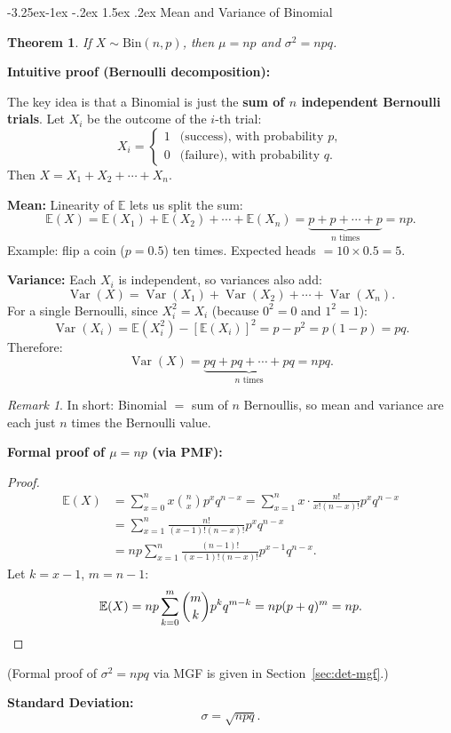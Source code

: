 \documentclass{article}
\makeatletter
\newtheorem{theorem}{Theorem}[section]
\theoremstyle{remark}
\newtheorem*{remark}{Remark}
\newlength{\subsecindent}
\renewcommand\subsection{\@startsection{subsection}{2}{\subsecindent}%
  {-3.25ex\@plus -1ex \@minus -.2ex}%
  {1.5ex \@plus .2ex}%
  {\normalfont\large\bfseries}}
\newenvironment{sub}{%
  \begin{list}{}{%
    \setlength{\leftmargin}{4em}%
    \setlength{\rightmargin}{0pt}%
    \setlength{\topsep}{0pt}%
    \setlength{\partopsep}{0pt}%
    \setlength{\parsep}{\parskip}%
    \setlength{\itemsep}{\parskip}%
  }\item\relax
}{\end{list}}
\newcommand{\E}{\mathbb{E}}
\newcommand{\Var}{\operatorname{Var}}
\makeatother
\begin{document}
\subsection{Mean and Variance of Binomial}
\begin{sub}

\begin{theorem}
  \label{thm:binom-mean}
  If $X \sim \text{Bin}(n, p)$, then $\mu = np$ and $\sigma^2 = npq$.
\end{theorem}

\textbf{Intuitive proof (Bernoulli decomposition):}

The key idea is that a Binomial is just the \textbf{sum of $n$ independent
Bernoulli trials}. Let $X_i$ be the outcome of the $i$-th trial:
\[
  X_i = \begin{cases} 1 & \text{(success), with probability } p, \\ 0 & \text{(failure), with probability } q. \end{cases}
\]
Then $X = X_1 + X_2 + \cdots + X_n$.

\textbf{Mean:} Linearity of $\E$ lets us split the sum:
\[
  \E(X) = \E(X_1) + \E(X_2) + \cdots + \E(X_n)
        = \underbrace{p + p + \cdots + p}_{n \text{ times}} = np.
\]
Example: flip a coin ($p=0.5$) ten times. Expected heads $= 10 \times 0.5 = 5$.

\textbf{Variance:} Each $X_i$ is independent, so variances also add:
\[
  \Var(X) = \Var(X_1) + \Var(X_2) + \cdots + \Var(X_n).
\]
For a single Bernoulli, since $X_i^2 = X_i$ (because $0^2=0$ and $1^2=1$):
\[
  \Var(X_i) = \E(X_i^2) - [\E(X_i)]^2 = p - p^2 = p(1-p) = pq.
\]
Therefore:
\[
  \Var(X) = \underbrace{pq + pq + \cdots + pq}_{n \text{ times}} = npq.
\]

\begin{remark}
  In short: Binomial $=$ sum of $n$ Bernoullis, so mean and variance are
  each just $n$ times the Bernoulli value.
\end{remark}

\medskip
\textbf{Formal proof of $\mu = np$ (via PMF):}
\begin{proof}
  \begin{align*}
    \E(X) &= \sum_{x=0}^{n} x \binom{n}{x} p^x q^{n-x}
           = \sum_{x=1}^{n} x \cdot \frac{n!}{x!(n-x)!} p^x q^{n-x} \\
          &= \sum_{x=1}^{n} \frac{n!}{(x-1)!(n-x)!} p^x q^{n-x} \\
          &= np \sum_{x=1}^{n} \frac{(n-1)!}{(x-1)!(n-x)!} p^{x-1} q^{n-x}.
  \end{align*}
  Let $k = x - 1$, $m = n - 1$:
  \[
    \E(X) = np \sum_{k=0}^{m} \binom{m}{k} p^k q^{m-k} = np(p+q)^m = np. \qedhere
  \]
\end{proof}

(Formal proof of $\sigma^2 = npq$ via MGF is given in Section~\ref{sec:det-mgf}.)

\textbf{Standard Deviation:}
\begin{equation}
  \sigma = \sqrt{npq}.
  \label{eq:binom-sd}
\end{equation}

\end{sub}
\end{document}
